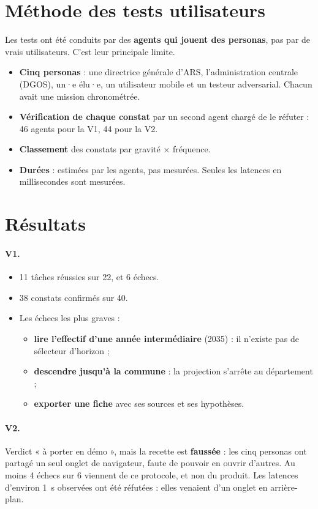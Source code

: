\section{Méthode des tests utilisateurs}
Les tests ont été conduits par des \textbf{agents qui jouent des personas}, pas par de vrais
utilisateurs. C'est leur principale limite.
\begin{itemize}
  \item \textbf{Cinq personas} : une directrice générale d'ARS, l'administration centrale
        (DGOS), un·e élu·e, un utilisateur mobile et un testeur adversarial. Chacun avait une
        mission chronométrée.
  \item \textbf{Vérification de chaque constat} par un second agent chargé de le réfuter :
        46 agents pour la V1, 44 pour la V2.
  \item \textbf{Classement} des constats par gravité $\times$ fréquence.
  \item \textbf{Durées} : estimées par les agents, pas mesurées. Seules les latences en
        millisecondes sont mesurées.
\end{itemize}

\section{Résultats}
\paragraph{V1.}
\begin{itemize}
  \item 11 tâches réussies sur 22, et 6 échecs.
  \item 38 constats confirmés sur 40.
  \item Les échecs les plus graves :
        \begin{itemize}
          \item \textbf{lire l'effectif d'une année intermédiaire} (2035) : il n'existe pas de
                sélecteur d'horizon ;
          \item \textbf{descendre jusqu'à la commune} : la projection s'arrête au
                département ;
          \item \textbf{exporter une fiche} avec ses sources et ses hypothèses.
        \end{itemize}
\end{itemize}

\paragraph{V2.} Verdict « à porter en démo », mais la recette est \textbf{faussée} : les cinq
personas ont partagé un seul onglet de navigateur, faute de pouvoir en ouvrir d'autres. Au
moins 4 échecs sur 6 viennent de ce protocole, et non du produit. Les latences d'environ 1~s
observées ont été réfutées : elles venaient d'un onglet en arrière-plan.

